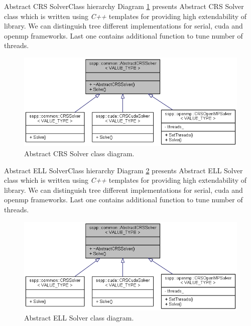 		\begin{design-element}{Abstract \glsdesc{CRS} Solver}{Class hierarchy}
			Diagram \ref{fig:crs-solver} presents Abstract \gls{CRS} Solver class which is written using \emph{C++} templates for providing high extendability of library. We can distinguish tree different implementations for serial, \gls{cuda} and \gls{openmp} frameworks. Last one contains additional function to tune number of threads. 
			\begin{figure}[!hp]
				\centering
				\includegraphics[scale=0.6]{others/img/abstract-crs-solver}
				\caption{Abstract \glsdesc{CRS} Solver class diagram.}
				\label{fig:crs-solver}
			\end{figure}
		\end{design-element}
		\clearpage
		\begin{design-element}{Abstract \glsdesc{ELL} Solver}{Class hierarchy}
				Diagram \ref{fig:ell-solver} presents Abstract \gls{ELL} Solver class which is written using \emph{C++} templates for providing high extendability of library. We can distinguish tree different implementations for serial, \gls{cuda} and \gls{openmp} frameworks. Last one contains additional function to tune number of threads. 
			\begin{figure}[!hp]
				\centering
				\includegraphics[scale=0.6]{others/img/abstract-crs-solver}
				\caption{Abstract \glsdesc{ELL} Solver class diagram.}
				\label{fig:ell-solver}
			\end{figure}
		\end{design-element}
	

